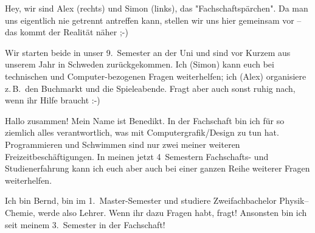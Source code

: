 \begin{multicols*}{2}

{%
Hey, wir sind Alex (rechts) und Simon (links), das "Fachschaftspärchen". Da man uns eigentlich nie getrennt antreffen kann, stellen wir uns hier gemeinsam vor -- das kommt der Realität näher ;-)

Wir starten beide in unser 9.~Semester an der Uni und sind vor Kurzem aus unserem Jahr in Schweden zurückgekommen. Ich (Simon) kann euch bei technischen und Computer-bezogenen Fragen weiterhelfen; ich (Alex) organisiere z.\,B.\ den Buchmarkt und die Spieleabende. Fragt aber auch sonst ruhig nach, wenn ihr Hilfe braucht :-)}
	
{Hallo zusammen! Mein Name ist Benedikt. In der Fachschaft bin ich für so ziemlich alles verantwortlich, was mit Computergrafik/Design zu tun hat. Programmieren und Schwimmen sind nur zwei meiner weiteren Freizeitbeschäftigungen. In meinen jetzt 4~Semestern Fachschafts- und Studienerfahrung kann ich euch aber auch bei einer ganzen Reihe weiterer Fragen weiterhelfen.}

{Ich bin Bernd, bin im 1.~Master-Semester und studiere Zweifachbachelor Physik--Chemie, werde also Lehrer.
Wenn ihr dazu Fragen habt, fragt!
Ansonsten bin ich seit meinem 3.~Semester in der Fachschaft!
\vspace{2\baselineskip}}


\end{multicols*}
